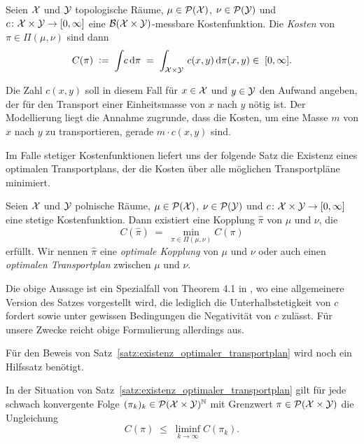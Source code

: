 \documentclass[../thesis/thesis.tex]{subfiles}
\begin{document}
	\begin{Definition}
		Seien $\mathcal{X}$ und $\mathcal{Y}$ topologische Räume, $\mu \in \mathcal{P}(\mathcal{X})$, $\nu \in \mathcal{P}(\mathcal{Y})$ und $c \colon \mathcal{X} \times \mathcal{Y} \to [0, \infty]$ eine $\mathcal{B}(\mathcal{X} \times \mathcal{Y})$-messbare Kostenfunktion.
		Die \emph{Kosten} von $\pi \in \Pi(\mu, \nu)$ sind dann
		\[ C(\pi) \; \vcentcolon = \; \int_{} \, c \, \mathrm{d}\pi \; = \; \int_{\mathcal{X} \times \mathcal{Y}} \, c(x, y) \, \mathrm{d}\pi(x, y) \in \; [0, \infty] \text{.} \]
	\end{Definition}

	Die Zahl $c(x, y)$ soll in diesem Fall für $x \in \mathcal{X}$ und $y \in \mathcal{Y}$ den Aufwand angeben, der für den Transport einer Einheitsmasse von $x$ nach $y$ nötig ist. Der Modellierung liegt die Annahme zugrunde, dass 
	die Kosten, um eine Masse $m$ von $x$ nach $y$ zu transportieren, gerade $m\cdot c(x, y)$ sind.
	
	Im Falle stetiger Kostenfunktionen liefert uns der folgende Satz die Existenz eines optimalen Transportplans, der die Kosten über alle möglichen Transportpläne minimiert.

	\begin{Satz}
		\label{satz:existenz_optimaler_transportplan}
		Seien $\mathcal{X}$ und $\mathcal{Y}$ polnische Räume, $\mu \in \mathcal{P}(\mathcal{X})$, $\nu \in \mathcal{P}(\mathcal{Y})$ und $c \colon \mathcal{X} \times \mathcal{Y} \to [0, \infty]$ eine stetige 
		Kostenfunktion. Dann existiert eine Kopplung $\hat{\pi}$ von $\mu$ und $\nu$, die 
		\[ C(\hat{\pi}) \; = \; \min_{\pi \in \Pi(\mu, \nu)} C(\pi) \]
		erfüllt. Wir nennen $\hat{\pi}$ eine \emph{optimale Kopplung} von $\mu$ und $\nu$ oder auch einen \emph{optimalen Transportplan} zwischen $\mu$ und $\nu$.
	\end{Satz}

	\begin{Bemerkung}
		Die obige Aussage ist ein Spezialfall von Theorem 4.1 in \cite{Villani.2009}, wo eine allgemeinere Version des Satzes vorgestellt wird, die lediglich die Unterhalbstetigkeit von $c$ fordert 
		sowie unter gewissen Bedingungen die Negativität von $c$ zulässt. Für unsere Zwecke reicht obige Formulierung allerdings aus.
	\end{Bemerkung}

	Für den Beweis von Satz~\ref{satz:existenz_optimaler_transportplan} wird noch ein Hilfssatz benötigt.

	\begin{Hilfssatz}
		\label{hilfssatz:kostenfunktional_unterhalbstetig}
		In der Situation von Satz~\ref{satz:existenz_optimaler_transportplan} gilt für jede schwach konvergente Folge $(\pi_k)_k \in \mathcal{P}(\mathcal{X} \times \mathcal{Y})^{\mathbb{N}}$ mit Grenzwert $\pi \in \mathcal{P}(\mathcal{X} \times \mathcal{Y})$ die Ungleichung
		\[ C(\pi) \; \leq \; \liminf_{k \to \infty} C(\pi_k) \text{.} \]
	\end{Hilfssatz}
\end{document}
